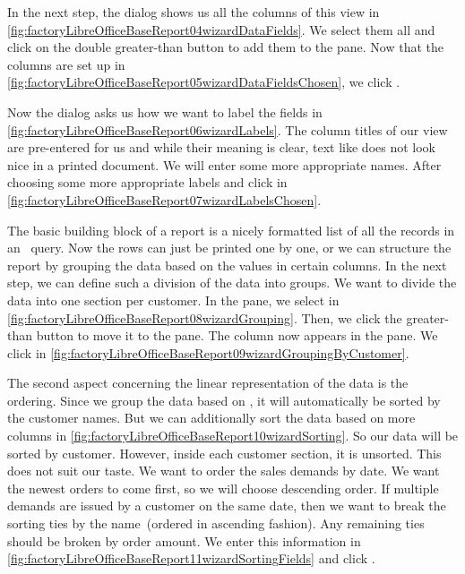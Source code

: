 In the next step, the dialog shows us all the columns of this view in \cref{fig:factoryLibreOfficeBaseReport04wizardDataFields}.
We select them all and click on the double greater-than button \menu{\textgreater\textgreater} to add them to the  pane.
Now that the columns are set up in \cref{fig:factoryLibreOfficeBaseReport05wizardDataFieldsChosen}, we click .

Now the dialog asks us how we want to label the fields in \cref{fig:factoryLibreOfficeBaseReport06wizardLabels}.
The column titles of our view are pre-entered for us and while their meaning is clear, text like  does not look nice in a printed document.
We will enter some more appropriate names.
After choosing some more appropriate labels and click  in \cref{fig:factoryLibreOfficeBaseReport07wizardLabelsChosen}.

The basic building block of a report is a nicely formatted list of all the records in an \sql\ query.
Now the rows can just be printed one by one, or we can structure the report by grouping the data based on the values in certain columns.
In the next step, we can define such a division of the data into groups.
We want to divide the data into one section per customer.
In the  pane, we select  in \cref{fig:factoryLibreOfficeBaseReport08wizardGrouping}.
Then, we click the greater-than button \menu{\textgreater} to move it to the  pane.
The column now appears in the  pane.
We click  in \cref{fig:factoryLibreOfficeBaseReport09wizardGroupingByCustomer}.

The second aspect concerning the linear representation of the data is the ordering.
Since we group the data based on , it will automatically be sorted by the customer names.
But we can additionally sort the data based on more columns in \cref{fig:factoryLibreOfficeBaseReport10wizardSorting}.
So our data will be sorted by customer.
However, inside each customer section, it is unsorted.
This does not suit our taste.
We want to order the sales demands by  date.
We want the newest orders to come first, so we will choose descending order.
If multiple demands are issued by a customer on the same date, then we want to break the sorting ties by the  name~(ordered in ascending fashion).
Any remaining ties should be broken by order amount.
We enter this information in \cref{fig:factoryLibreOfficeBaseReport11wizardSortingFields} and click .

